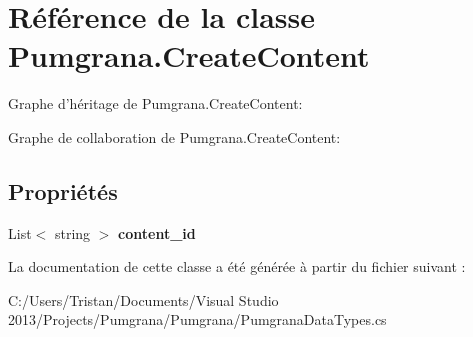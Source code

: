 \hypertarget{class_pumgrana_1_1_create_content}{\section{Référence de la classe Pumgrana.\+Create\+Content}
\label{class_pumgrana_1_1_create_content}
}


Graphe d'héritage de Pumgrana.\+Create\+Content\+:


Graphe de collaboration de Pumgrana.\+Create\+Content\+:
\subsection*{Propriétés}
\begin{DoxyCompactItemize}
\item 
\hypertarget{class_pumgrana_1_1_create_content_a7735fd4808b98b13ed62b8d0ccc9fea5}{List$<$ string $>$ {\bfseries content\+\_\+id}}\label{class_pumgrana_1_1_create_content_a7735fd4808b98b13ed62b8d0ccc9fea5}

\end{DoxyCompactItemize}


La documentation de cette classe a été générée à partir du fichier suivant \+:\begin{DoxyCompactItemize}
\item 
C\+:/\+Users/\+Tristan/\+Documents/\+Visual Studio 2013/\+Projects/\+Pumgrana/\+Pumgrana/Pumgrana\+Data\+Types.\+cs\end{DoxyCompactItemize}
